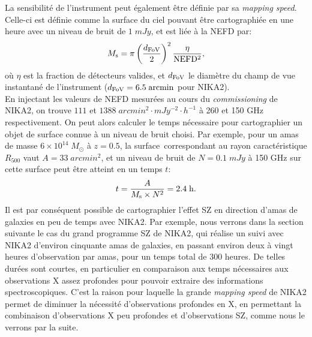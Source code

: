 La sensibilité de l'instrument peut également être définie par sa \textit{mapping speed}.
Celle-ci est définie comme la surface du ciel pouvant être cartographiée en une heure avec un niveau de bruit de $1 \;\unit{mJy}$, et est liée à la NEFD par:
\begin{equation}
    M_{\rm s} = \pi \left(\frac{d_{\rm FoV}}{2}\right)^2 \frac{\eta}{\rm NEFD^2},
\end{equation}
où $\eta$ est la fraction de détecteurs valides, et $d_{\rm FoV}$ le diamètre du champ de vue instantané de l'instrument ($d_{\rm FoV} = 6.5 \;\rm arcmin$ pour NIKA2). \\
En injectant les valeurs de NEFD mesurées au cours du \textit{commissioning} de NIKA2, on trouve $111$ et $1388 \;\unit{arcmin^2 \cdot mJy^{-2} \cdot h^{-1}}$ à 260 et 150 GHz respectivement\footnotemark.
On peut alors calculer le temps nécessaire pour cartographier un objet de surface connue à un niveau de bruit choisi.
Par exemple, pour un amas de masse $6 \times 10^{14} \;M_\odot$ à $z=0.5$, la surface\footnotemark\ correspondant au rayon caractéristique $R_{500}$ vaut $A = 33 \;\unit{arcmin^2}$, et un niveau de bruit de $N = 0.1 \;\unit{mJy}$ à 150 GHz sur cette surface peut être atteint en un temps $t$:
\begin{equation}
    \label{eq:nk_time}
    t = \frac{A}{M_{\rm s} \times N^2} = 2.4 \;{\rm h}.
\end{equation}
Il est par conséquent possible de cartographier l'effet SZ en direction d'amas de galaxies en peu de temps avec NIKA2.
Par exemple, nous verrons dans la section suivante le cas du grand programme SZ de NIKA2, qui réalise un suivi avec NIKA2 d'environ cinquante amas de galaxies, en passant environ deux à vingt heures d'observation par amas, pour un temps total de 300 heures.
De telles durées sont courtes, en particulier en comparaison aux temps nécessaires aux observations X assez profondes pour pouvoir extraire des informations spectroscopiques.
C'est la raison pour laquelle la grande \textit{mapping speed} de NIKA2 permet de diminuer la nécessité d'observations profondes en X, en permettant la combinaison d'observations X peu profondes et d'observations SZ, comme nous le verrons par la suite.


